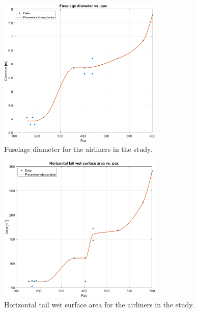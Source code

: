 \documentclass[english]{kththesis}
\begin{document}
\begin{figure}[!ht]
    \centering
    \includegraphics[width=0.7\textwidth]{Epictures/FuselageDiaVSPax.png}
    \caption{Fuselage diameter for the airliners in the study.}
    \label{fig:FuselageDiaPax}
\end{figure}

\begin{figure}[!ht]
    \centering
    \includegraphics[width=0.7\textwidth]{Epictures/HTailWetVSPax.png}
    \caption{Horizontal tail wet surface area for the airliners in the study.}
    \label{fig:HtailWetPax}
\end{figure}
\end{document}
